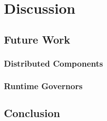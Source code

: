 \chapter{Discussion}
\section{Future Work}
\subsection{Distributed Components}
\subsection{Runtime Governors}
\section{Conclusion}